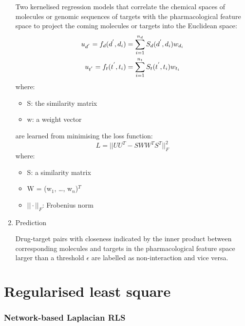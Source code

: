 \documentclass[a4paper,12pt]{report}
\begin{document}
\begin{enumerate}
Two kernelised regression models that correlate the chemical spaces of molecules or genomic sequences of targets with the pharmacological feature space to project the coming molecules or targets into the Euclidean space:
\begin{eqnarray}
\boldmath{u}_{d^{'}} = f_d(d^{'}, d_i) &= \sum^{n_d}_{i=1}S_d(d^{'}, d_i)w_{d_i}\\
\boldmath{u}_{t^{'}} = f_t(t^{'}, t_i) &= \sum^{n_t}_{i=1}S_t(t^{'}, t_i)w_{t_i} 
\end{eqnarray}
where:
\begin{itemize}
\item[] S: the similarity matrix
\item[] w: a weight vector
\end{itemize}
are learned from minimising the loss function:
\begin{equation}
L = ||UU^T - SWW^TS^T||^2_F
\end{equation}
where:
\begin{itemize}
\item[] S: a similarity matrix
\item[] W = (w$_1$, \dots, w$_n$)$^T$
\item[] $||\cdot||_F$: Frobenius norm
\end{itemize}

\item{Prediction}

Drug-target pairs with closeness indicated by the inner product between corresponding molecules and targets in the pharmacological feature space larger than a threshold $\epsilon$ are labelled as non-interaction and vice versa.
\end{enumerate}

\section{Regularised least square}

\subsubsection{Network-based Laplacian RLS}
\end{document}
